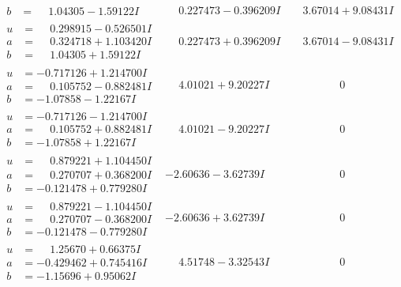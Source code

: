 \documentclass[1p]{elsarticle_modified}
\theoremstyle{definition}
\begin{document}
$$\begin{array}{c|c|c}
\begin{aligned}
b &= \phantom{-}1.04305 - 1.59122 I\end{aligned}
 & \phantom{-}0.227473 - 0.396209 I & \phantom{-}3.67014 + 9.08431 I \\ \hline\begin{aligned}
u &= \phantom{-}0.298915 - 0.526501 I \\
a &= \phantom{-}0.324718 + 1.103420 I \\
b &= \phantom{-}1.04305 + 1.59122 I\end{aligned}
 & \phantom{-}0.227473 + 0.396209 I & \phantom{-}3.67014 - 9.08431 I \\ \hline\begin{aligned}
u &= -0.717126 + 1.214700 I \\
a &= \phantom{-}0.105752 - 0.882481 I \\
b &= -1.07858 - 1.22167 I\end{aligned}
 & \phantom{-}4.01021 + 9.20227 I & \phantom{-0.000000 } 0 \\ \hline\begin{aligned}
u &= -0.717126 - 1.214700 I \\
a &= \phantom{-}0.105752 + 0.882481 I \\
b &= -1.07858 + 1.22167 I\end{aligned}
 & \phantom{-}4.01021 - 9.20227 I & \phantom{-0.000000 } 0 \\ \hline\begin{aligned}
u &= \phantom{-}0.879221 + 1.104450 I \\
a &= \phantom{-}0.270707 + 0.368200 I \\
b &= -0.121478 + 0.779280 I\end{aligned}
 & -2.60636 - 3.62739 I & \phantom{-0.000000 } 0 \\ \hline\begin{aligned}
u &= \phantom{-}0.879221 - 1.104450 I \\
a &= \phantom{-}0.270707 - 0.368200 I \\
b &= -0.121478 - 0.779280 I\end{aligned}
 & -2.60636 + 3.62739 I & \phantom{-0.000000 } 0 \\ \hline\begin{aligned}
u &= \phantom{-}1.25670 + 0.66375 I \\
a &= -0.429462 + 0.745416 I \\
b &= -1.15696 + 0.95062 I\end{aligned}
 & \phantom{-}4.51748 - 3.32543 I & \phantom{-0.000000 } 0 \\ \hline\begin{aligned}

\end{aligned}
\end{array}$$
\end{document}

